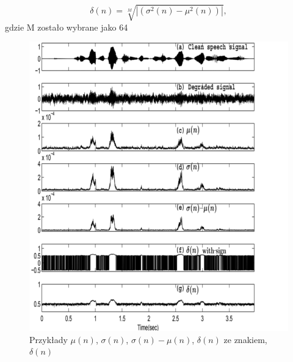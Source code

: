 \documentclass[eng,printmode]{mgr}
\begin{document}
  \begin{equation}
	  \delta(n) =\sqrt[M]{|{(\sigma^2(n) - \mu^2(n))}|},
  \end{equation}
    \hspace{9cm}gdzie M zostało wybrane jako 64 \vspace{5mm}
   \begin{figure}
   	\begin{center}
    	\includegraphics[scale=0.5]{SFFdelta.png}
   		\caption{Przykłady $\mu(n)$, $\sigma(n)$, $\sigma(n)- \mu(n)$, $\delta(n)$ ze znakiem, $\delta(n)$} 
   	\end{center}
   \end{figure}
   
\end{document}
